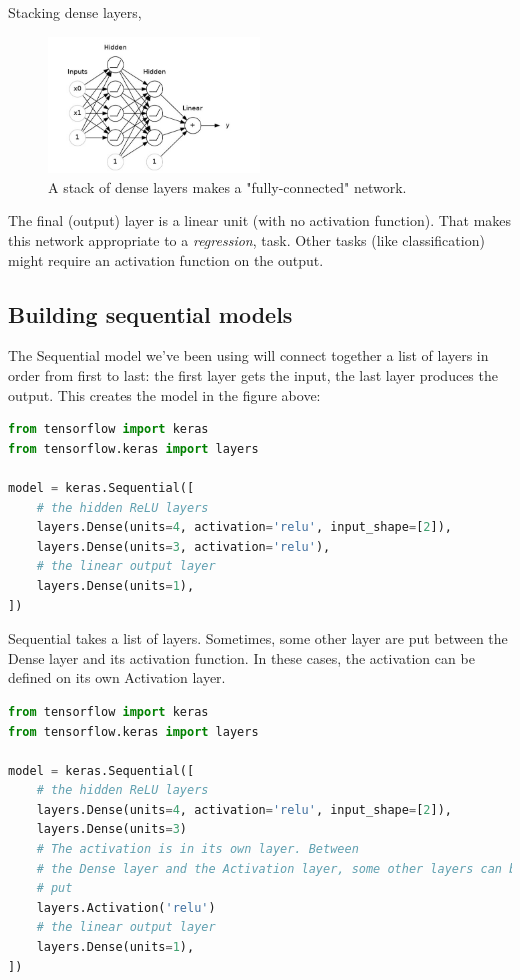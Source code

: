 \noindent Stacking dense layers,

\begin{figure}[htp]
	\centering
	\includegraphics[width=0.5\textwidth]{../assets/machine_learning_random/stack_of_dense_layers.jpg}
	\caption{A stack of dense layers makes a "fully-connected" network.}
\end{figure}

\noindent The final (output) layer is a linear unit (with no activation function).
That makes this network appropriate to a \emph{regression}, task. Other tasks (like
classification) might require an activation function on the output.

\subsection{Building sequential models}
The Sequential model we've been using will connect together a list of layers
in order from first to last: the first layer gets the input, the last layer
produces the output. This creates the model in the figure above:

\begin{lstlisting}[language=Python]
from tensorflow import keras
from tensorflow.keras import layers

model = keras.Sequential([
    # the hidden ReLU layers
    layers.Dense(units=4, activation='relu', input_shape=[2]),
    layers.Dense(units=3, activation='relu'),
    # the linear output layer 
    layers.Dense(units=1),
])
\end{lstlisting}

\noindent Sequential takes a list of layers. Sometimes, some other
layer are put between the Dense layer and its activation function. In
these cases, the activation can be defined on its own Activation layer.

\begin{lstlisting}[language=Python]
from tensorflow import keras
from tensorflow.keras import layers

model = keras.Sequential([
    # the hidden ReLU layers
    layers.Dense(units=4, activation='relu', input_shape=[2]),
    layers.Dense(units=3)
    # The activation is in its own layer. Between
    # the Dense layer and the Activation layer, some other layers can be 
    # put
    layers.Activation('relu')
    # the linear output layer 
    layers.Dense(units=1),
])
\end{lstlisting}

